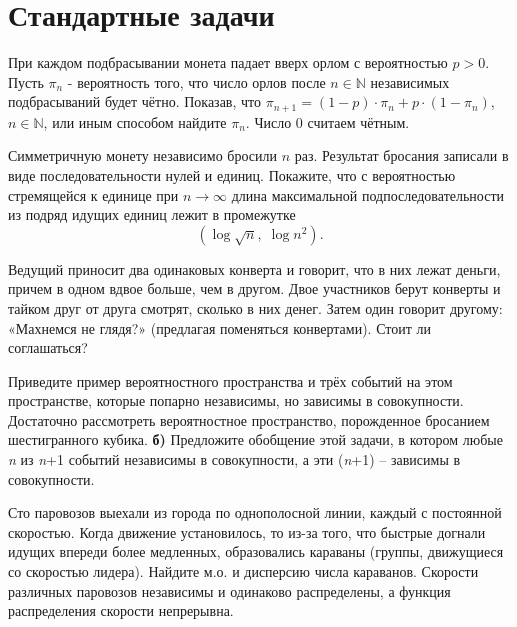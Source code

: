 \section{Стандартные задачи}

\begin{problem}
При каждом подбрасывании монета падает вверх орлом с вероятностью $p>0$. Пусть $\pi _{n} $ - вероятность того, что число орлов после $n\in {\mathbb N}$ независимых подбрасываний будет чётно. Показав, что $\pi _{n+1} =\left(1-p\right)\cdot \pi _{n} +p\cdot \left(1-\pi _{n} \right)$, $n\in {\mathbb N}$, или иным способом найдите $\pi _{n} $. Число $0$ считаем чётным.
\end{problem}

\begin{problem}
Симметричную монету независимо бросили $n$ раз. Результат бросания записали в виде последовательности нулей и единиц. Покажите, что с вероятностью стремящейся к единице при $n\to \infty $ длина максимальной подпоследовательности из подряд идущих единиц лежит в промежутке
\[\left(\log \sqrt{n} ,\; \log n^{2} \right).\] 
\end{problem}

\begin{problem}
Ведущий приносит два одинаковых конверта и говорит, что в них лежат деньги, причем в одном вдвое больше, чем в другом. Двое участников берут конверты и тайком друг от друга смотрят, сколько в них денег. Затем один говорит другому: «Махнемся не глядя?» (предлагая поменяться конвертами). Стоит ли соглашаться?
\end{problem}

\begin{problem}
Приведите пример вероятностного пространства и трёх событий на этом пространстве, которые попарно независимы, но зависимы в совокупности. Достаточно рассмотреть вероятностное пространство, порожденное бросанием шестигранного кубика. \textbf{б) }Предложите обобщение этой задачи, в котором любые \textit{n} из \textit{n}+1 событий независимы в совокупности, а эти (\textit{n}+1) -- зависимы в совокупности.
\end{problem}

\begin{problem}
Сто паровозов выехали из города по однополосной линии, каждый с постоянной скоростью. Когда движение установилось, то из-за того, что быстрые догнали идущих впереди более медленных, образовались караваны (группы, движущиеся со скоростью лидера). Найдите м.о. и дисперсию числа караванов. Скорости различных паровозов независимы и одинаково распределены, а функция распределения скорости непрерывна.
\end{problem}

